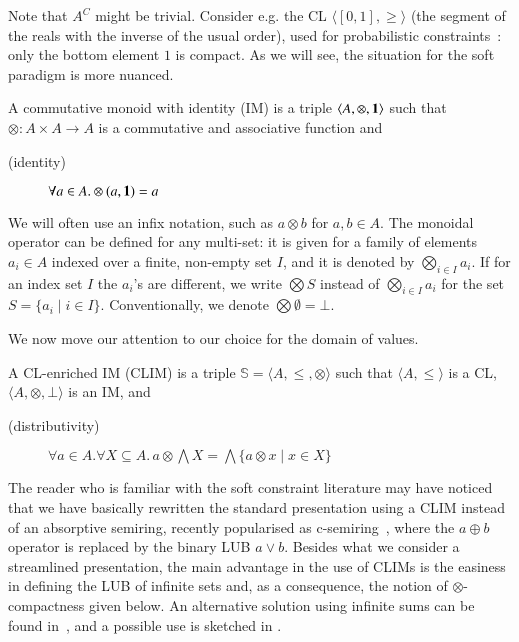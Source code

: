 \documentclass[main.tex]{subfiles}
\begin{document}
\begin{example}
Note that $A^C$ might be trivial. Consider e.g. the CL $\langle [0, 1], \geq \rangle$ (the segment of the reals
with the inverse of the usual order), used for probabilistic constraints~\cite{probabilistic}:
only the bottom element $1$ is compact. 
%
As we will see, the situation for the soft paradigm is more nuanced.
\end{example}
%

\begin{definition}[Monoids]
A commutative monoid with identity (IM) is a triple
$\langle A, \otimes, {\mathbf 1} \rangle$ such that $\otimes: A \times A \rightarrow A$ is
a commutative and associative function and 
 \begin{description}
 \item[(identity)] $\forall a \in A.\otimes (a, {\mathbf 1}) = a$
 \end{description}
\end{definition}

We will often use an infix notation, such as $a \otimes b$ for $a, b \in A$.
%
The monoidal operator can be defined for any multi-set: it is given 
for a family of elements $a_i \in A$ indexed over a finite, non-empty
set $I$, and it is denoted by
$\bigotimes_{i \in I} a_i$.
%
If for an index set $I$ the $a_i$'s are different,
we write $\bigotimes S$ instead of $\bigotimes_{i \in I} a_i$
for the set $S = \{a_i \mid i \in I\}$.
%
Conventionally, we denote $\bigotimes \emptyset = \bot$.


We now move our attention to our choice for the domain of values.

\begin{definition}
A CL-enriched IM (CLIM) is a triple ${\mathbb S} = \langle A, \leq, \otimes \rangle$ such that
 $\langle A, \leq \rangle$ is a CL,  $\langle A, \otimes, \bot \rangle$ is an IM,
 and
 \begin{description}
 \item[(distributivity)] $\forall a \in A. \forall X \subseteq A.\, a \otimes  \bigwedge X = \bigwedge \{a \otimes x \mid x \in X\}$
 \end{description}
\end{definition}

\begin{remark}
The reader who is familiar with the soft constraint literature may have noticed that we have 
basically rewritten the standard presentation using a CLIM instead of an absorptive 
semiring, recently popularised as c-semiring~\cite{jacm}, where the $a \oplus b$ operator is 
replaced by the binary LUB $a \vee b$. 
%
Besides what we consider a streamlined presentation, the main advantage in the use of 
CLIMs is the easiness in defining the LUB of infinite sets and, as a consequence, the notion of 
$\otimes$-compactness given below. 
%
An alternative solution using infinite sums can be found in~\cite[Section~3]{golan}, 
and a possible use is sketched in \cite{ecai06}.
\end{remark}
\end{document}
